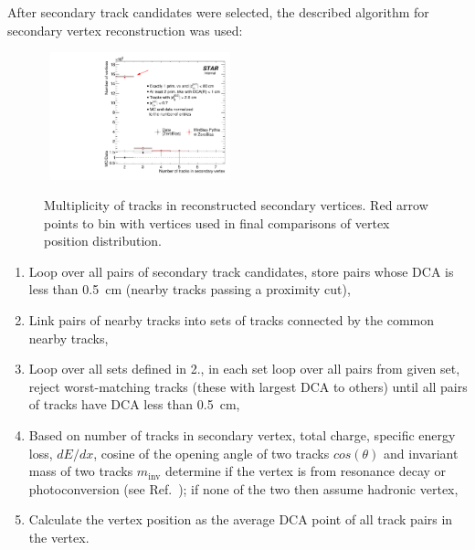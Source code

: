 After secondary track candidates were selected, the described algorithm for secondary vertex reconstruction was used:\\[-20pt]%
\begin{figure}\vspace{-\baselineskip}%
  \centering%
  ~\includegraphics[width=0.465\textwidth]{graphics/deadMaterial/NTracksInVertex_DataVsMC.pdf}%
  \caption[Multiplicity of tracks in reconstructed secondary vertices.]{Multiplicity of tracks in reconstructed secondary vertices. Red arrow points to bin with vertices used in final comparisons of vertex position distribution.}\label{fig:nTrksInSecVx}\vspace{-30pt}%
\end{figure}%
\vspace{-8pt}\begin{enumerate}
    \item Loop over all pairs of secondary track candidates, store pairs whose DCA is less than 0.5~cm (nearby tracks passing a proximity cut),\vspace{-8pt}
    \item Link pairs of nearby tracks into sets of tracks connected by the common nearby tracks,\vspace{-8pt}
    \item Loop over all sets defined in 2., in each set loop over all pairs from given set, reject worst-matching tracks (these with largest DCA to others) until all pairs of tracks have DCA less than 0.5~cm,\vspace{-8pt}
    \item Based on number of tracks in secondary vertex, total charge, specific energy loss, $dE/dx$, cosine of the opening angle of two tracks $cos(\theta)$ and invariant mass of two tracks $m_{\text{inv}}$ determine if the vertex is from resonance decay or photoconversion (see Ref.~\cite{deadMatSlides}); if none of the two then assume hadronic vertex,\vspace{-8pt}
    \item Calculate the vertex position as the average DCA point of all track pairs in the vertex.
   \end{enumerate}%

